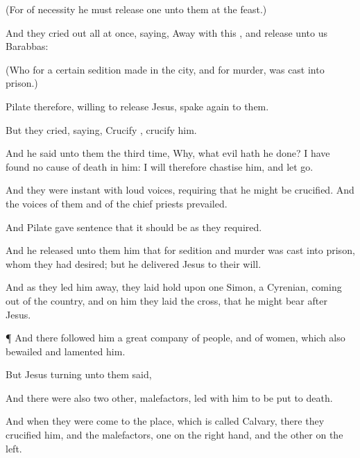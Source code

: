{(For of
necessity he
must
release
one unto
them
at the
feast.)

And they cried
out all at
once,
saying, Away
with
this
{},
and
release unto
us
Barabbas:

(Who
for a
certain
sedition
made
in the
city,
and for
murder, was
cast
into
prison.)

Pilate
therefore,
willing to
release
Jesus,
spake again to
them.

But they
cried,
saying,
Crucify
{},
crucify
him.

And he
said
unto
them the third
time,
Why,
what
evil
hath
he
done? I have
found
no
cause of
death
in
him: I
will
therefore
chastise
him, and
let
{}
go.

And they were
instant with
loud
voices,
requiring
that
he might be
crucified.
And the
voices of
them
and of the chief
priests
prevailed.

And
Pilate gave
sentence that it should
be as
they
required.

And he
released unto
them him
that
for
sedition
and
murder was
cast
into
prison,
whom they had
desired;
but he
delivered
Jesus to
their
will.

And
as they
led
him
away, they laid hold
upon
one
Simon, a
Cyrenian, coming
out
of the
country,
and on
him they
laid the
cross, that he might
bear
{}
after
Jesus.


\par }{\PP {}¶
And there
followed
him a
great
company of
people,
and of
women,
which
also
bewailed
and
lamented
him.

But
Jesus
turning
unto
them
said,
{}




And there
were
also
two
other,
malefactors, led
with
him to be put to
death.

And
when they were
come
to the
place,
which is
called
Calvary,
there they
crucified
him,
and the
malefactors,
one
on the right
hand,
and the
other
on the
left.


}
